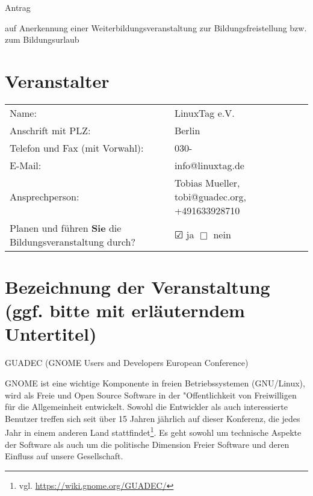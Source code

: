 \documentclass{scrartcl}
\newcommand{\thetitle}{Antrag

auf Anerkennung
einer Weiterbildungsveranstaltung
zur Bildungsfreistellung bzw. zum Bildungsurlaub}
\begin{document}
\begin{Large}
\hspace{.25\textwidth}\begin{minipage}{.75\textwidth}
\begin{center}
\thetitle
\end{center}
\end{minipage}
\end{Large}
\vspace{5ex}

\section{Veranstalter}
\begin{tabu} to 0.85\textwidth { X X }
Name: &                              
            LinuxTag e.V.
            \\
Anschrift mit PLZ: &
            Berlin
            \\
Telefon und Fax (mit Vorwahl): &     
            030-
            \\
E-Mail:                      &       
            info@linuxtag.de
            \\
Ansprechperson:              &       
            Tobias Mueller,
            tobi@guadec.org,
            +491633928710
            \\
Planen und führen \textbf{Sie} die Bildungsveranstaltung durch? & 
    $\CheckedBox$ ja \vspace{5em} $\Box$ nein\\
\end{tabu}

\section{Bezeichnung der Veranstaltung (ggf. bitte mit erläuterndem Untertitel)}

GUADEC (GNOME Users and Developers European Conference)

      GNOME ist eine wichtige Komponente in freien Betriebssystemen (GNU/Linux),
      wird als Freie und Open Source Software in der "Offentlichkeit von
      Freiwilligen für die Allgemeinheit entwickelt.
      Sowohl die Entwickler als auch interessierte Benutzer treffen sich seit
      über 15 Jahren jährlich auf dieser Konferenz, die jedes Jahr in einem
      anderen Land stattfindet\footnote{vgl. \url{https://wiki.gnome.org/GUADEC/}}.
      Es geht sowohl um technische Aspekte der Software als auch um die
      politische Dimension Freier Software und deren Einfluss auf unsere
      Gesellschaft.
\end{document}
